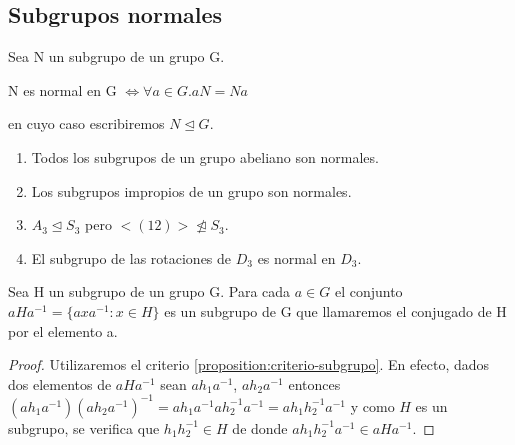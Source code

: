 \subsection{Subgrupos normales}

\begin{ndef}
Sea N un subgrupo de un grupo G. 

N es normal en G $\iff \forall a \in G. aN = Na$ 

en cuyo caso escribiremos $N \unlhd G$.
\end{ndef}

\begin{ejemplo}
\begin{enumerate}
\item Todos los subgrupos de un grupo abeliano son normales.
\item Los subgrupos impropios de un grupo son normales.
\item $A_3 \trianglelefteq S_3$ pero $<(12)> \ntrianglelefteq S_3$.
\item El subgrupo de las rotaciones de $D_3$ es normal en $D_3$.
\end{enumerate}
\end{ejemplo}

\begin{nprop}
Sea H un subgrupo de un grupo G. Para cada $a \in G$ el conjunto $aHa^{-1} = \{axa^{-1}:x \in H\}$ es un subgrupo de G que llamaremos el conjugado de H por el elemento a. 
\end{nprop}
\begin{proof}
Utilizaremos el criterio \ref{proposition:criterio-subgrupo}. En efecto, dados dos elementos de $aHa^{-1}$ sean $ah_1a^{-1}$, $ah_2a^{-1}$ entonces $(ah_1a^{-1})(ah_2a^{-1})^{-1} = ah_1a^{-1}ah_2^{-1}a^{-1} = ah_1h_2^{-1}a^{-1}$ y como $H$ es un subgrupo, se verifica que $h_1h_2^{-1} \in H$ de donde $ah_1h_2^{-1}a^{-1} \in aHa^{-1}$.
\end{proof}

